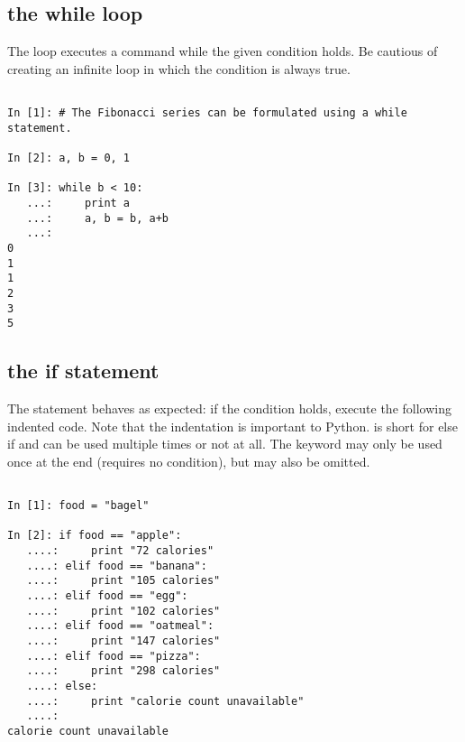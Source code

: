 \subsection*{the while loop}
\begin{example}

The  loop executes a command while the given condition holds. 
Be cautious of creating an infinite loop in which the condition is always true.

\begin{lstlisting}

In [1]: # The Fibonacci series can be formulated using a while statement. 

In [2]: a, b = 0, 1

In [3]: while b < 10:
   ...:     print a
   ...:     a, b = b, a+b
   ...:     
0
1
1
2
3
5

\end{lstlisting}
\end{example}

\subsection*{the if statement}
\begin{example}

The  statement behaves as expected: if the condition holds, execute the 
following indented code. Note that the indentation is important to Python. 
 is short for else if and can be used multiple times or not at all. 
The  keyword may only be used once at the end (requires no condition), 
but may also be omitted. 

\begin{lstlisting}

In [1]: food = "bagel"

In [2]: if food == "apple":
   ....:     print "72 calories"
   ....: elif food == "banana":
   ....:     print "105 calories"
   ....: elif food == "egg":
   ....:     print "102 calories"
   ....: elif food == "oatmeal":
   ....:     print "147 calories"
   ....: elif food == "pizza":
   ....:     print "298 calories"
   ....: else: 
   ....:     print "calorie count unavailable"
   ....:     
calorie count unavailable
   
\end{lstlisting}
\end{example}

